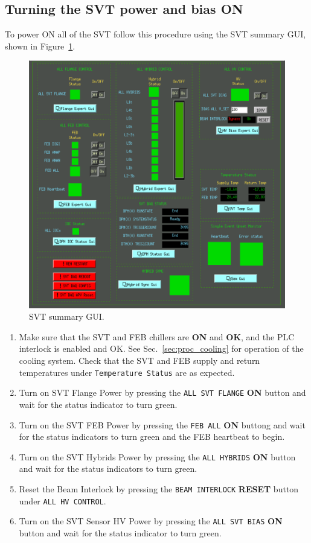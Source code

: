 \documentclass[12pt]{report}
\begin{document}
\subsection{Turning the SVT power and bias ON}
\label{sec:proc_voltages_allon}
To power ON all of the SVT follow this procedure using the SVT summary GUI, shown in Figure~\ref{fig:svt_summary_gui}.
\begin{figure}[htbp]
\begin{center}
    \includegraphics[width=\textwidth]{svt_summary_gui.png}
\caption{SVT summary GUI.}
\label{fig:svt_summary_gui}
\end{center}
\vspace*{-5mm}
\end{figure}
\begin{enumerate}
\item Make sure that the SVT and FEB chillers are \textbf{ON} and \textbf{OK}, and the PLC interlock is enabled and OK. See Sec.~\ref{sec:proc_cooling} for operation of the cooling system.  Check that the SVT and FEB supply and return temperatures under \texttt{Temperature Status} are as expected.
\item Turn on SVT Flange Power by pressing the \texttt{ALL SVT FLANGE} \textbf{ON} button and wait for the status indicator to turn green.
\item Turn on the SVT FEB Power by pressing the \texttt{FEB ALL} \textbf{ON} buttong and wait for the status indicators to turn green and the FEB heartbeat to begin.
\item Turn on the SVT Hybrids Power by pressing the \texttt{ALL HYBRIDS} \textbf{ON} button and wait for the status indicators to turn green.
\item Reset the Beam Interlock by pressing the \texttt{BEAM INTERLOCK} \textbf{RESET} button under \texttt{ALL HV CONTROL}.
\item Turn on the SVT Sensor HV Power by pressing the \texttt{ALL SVT BIAS} \textbf{ON} button and wait for the status indicator to turn green.
\end{enumerate}
\end{document}

